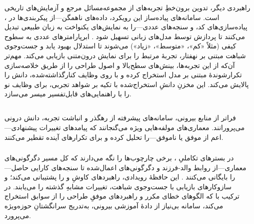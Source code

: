 راهبردی دیگر، تدوین برون‌خطِ تجربه‌های  از مجموعه‌مسائل مرجع و آزمایش‌های تاریخی است. سامانه‌های پیاده‌ساز این رویکرد، داده‌های ناهمگن—از پیکربندی‌ها در ، پیاده‌سازی‌های کد، و سنجه‌های عددی—را به نمایش‌های یکنواخت به زبان طبیعی تبدیل می‌کنند تا پردازش توسط مدل‌های زبانی تسهیل شود \cite{zhang-etal-2024-MLCopilot}. ابرپارامترهای عددی به سطوح کیفی (مثلاً «کم»، «متوسط»، «زیاد»)  می‌شوند تا استدلال بهبود یابد و جست‌وجوی شباهت مبتنی بر نهفتار،  تجربهٔ مرتبط را برای نمایش درون‌متنی بازیابی می‌کند. مهم‌تر آن‌که  از این تجربه‌ها، بینش‌های سطح‌بالا و اصول طراحی را از طریق خلاصه‌سازی تکرارشوندهٔ مبتنی بر مدل استخراج کرده و با  روی وظایف کنارگذاشته‌شده، دانش  را پالایش می‌کند. این مخزنِ دانشِ استخراج‌شده با تکیه بر شواهد تجربی،  برای وظایف نو را با راهنمایی‌های قابل‌تفسیر میسر می‌سازد.

\subsection[دانشِ خودتولید و سازوکارهای بازتاب]{\protect{}}

فراتر از منابع بیرونی، سامانه‌های پیشرفته از رهگذر  و انباشت تجربه، دانش درونی می‌پرورانند. معماری‌های  مولفه‌هایی ویژه می‌گنجانند که پیامدهای تغییرات پیشنهادی—اعم از موفق یا ناموفق—را تحلیل کرده و  برای تکرارهای آینده تقطیر می‌کنند.

\subsubsection{\protect{}}

در بسترهای تکاملیِ ، برخی چارچوب‌ها  را نگه می‌دارند که کل مسیر دگرگونی‌های معماری—از روابط والد-فرزند و دگرگونی‌های اعمال‌شده تا سنجه‌های کارایی حاصل—را بایگانی می‌کنند \cite{Yang2025NADER}. این حافظهٔ رویدادی، راهبردهای کاوشِ  و  را پشتیبانی می‌کند؛ و سازوکارهای بازیابی با جست‌وجوی شباهت، تغییرات مشابهِ گذشته را می‌یابند. در ترکیب با  که الگوهای خطای مکرر و راهبردهای موفقِ طراحی را از سوابق استخراج می‌کند، سامانه بی‌نیاز از دادهٔ آموزشی بیرونی، به‌تدریج سرانگشتانِ حوزه‌ویژه می‌پرورد.

